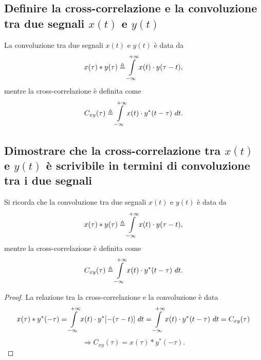 \documentclass[12pt,oneside,openany]{memoir}
\numberwithin{equation}{subsection}
\newcommand{\dt}{\ dt}
\begin{document}

\newpage
\subsection{Definire la cross-correlazione e la convoluzione tra due segnali
$x(t)$ e $y(t)$}
La convoluzione tra due segnali $x(t)$ e $y(t)$ \`e data da
\[
    x(\tau) * y(\tau) \triangleq \int\displaylimits_{-\infty}^{+\infty} x(t)
    \cdot y(\tau - t),
\]
mentre la cross-correlazione \`e definita come
\[
    C_{xy} (\tau) \triangleq \int\displaylimits_{-\infty}^{+\infty} x(t) \cdot
    y^*(t - \tau) \dt.
\]


\newpage
\subsection{Dimostrare che la cross-correlazione tra $x(t)$ e $y(t)$ \`e
scrivibile in termini di convoluzione tra i due segnali}
Si ricorda che la convoluzione tra due segnali $x(t)$ e $y(t)$ \`e data da
\[
    x(\tau) * y(\tau) \triangleq \int\displaylimits_{-\infty}^{+\infty} x(t)
    \cdot y(\tau - t),
\]
mentre la cross-correlazione \`e definita come
\[
    C_{xy} (\tau) \triangleq \int\displaylimits_{-\infty}^{+\infty} x(t) \cdot
    y^*(t - \tau) \dt.
\]
\begin{proof} La relazione tra la cross-correlazione e la convoluzione \`e data
\[
    x(\tau) * y^*(-\tau) = \int\displaylimits_{-\infty}^{+\infty} x(t) \cdot
    y^*[-(\tau - t)] \dt = \int\displaylimits_{-\infty}^{+\infty} x(t) \cdot
    y^*(t - \tau) \dt = C_{xy}(\tau)
\]
\[
    \Longrightarrow C_{xy}(\tau) = x(\tau) * y^*(-\tau).
\]
\end{proof}

\end{document}
